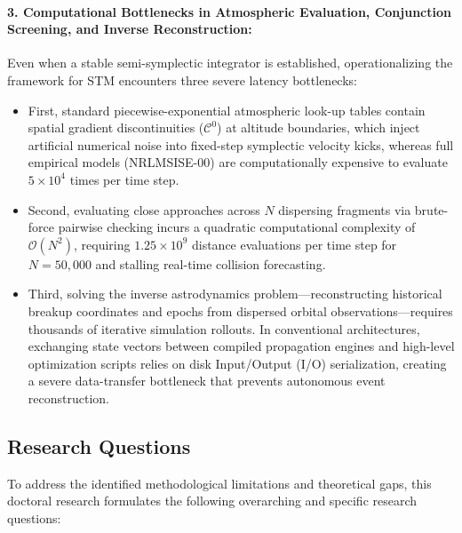 \paragraph{3. Computational Bottlenecks in Atmospheric Evaluation, Conjunction Screening, and Inverse Reconstruction:}
Even when a stable semi-symplectic integrator is established, operationalizing the framework for STM encounters three severe latency bottlenecks:
\begin{itemize}
    \item First, standard piecewise-exponential atmospheric look-up tables contain spatial gradient discontinuities ($\mathcal{C}^0$) at altitude boundaries, which inject artificial numerical noise into fixed-step symplectic velocity kicks, whereas full empirical models (NRLMSISE-00) are computationally expensive to evaluate $5 \times 10^4$ times per time step.
    \item Second, evaluating close approaches across $N$ dispersing fragments via brute-force pairwise checking incurs a quadratic computational complexity of $\mathcal{O}(N^2)$, requiring $1.25 \times 10^9$ distance evaluations per time step for $N = 50,000$ and stalling real-time collision forecasting.
    \item Third, solving the inverse astrodynamics problem---reconstructing historical breakup coordinates and epochs from dispersed orbital observations---requires thousands of iterative simulation rollouts. In conventional architectures, exchanging state vectors between compiled propagation engines and high-level optimization scripts relies on disk Input/Output (I/O) serialization, creating a severe data-transfer bottleneck that prevents autonomous event reconstruction.
\end{itemize}

\subsection{Research Questions}
\label{subsec:research_questions}

To address the identified methodological limitations and theoretical gaps, this doctoral research formulates the following overarching and specific research questions:


